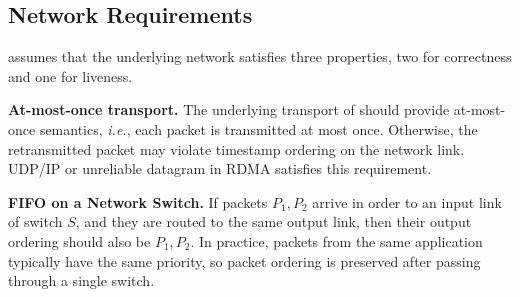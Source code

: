 




\iffalse
\subsection{Network Requirements}
\label{sec:assumptions}

\sys assumes that the underlying network satisfies three properties, two for correctness and one for liveness.

\textbf{At-most-once transport.}
The underlying transport of \sys should provide at-most-once semantics, \textit{i.e.}, each packet is transmitted at most once.
Otherwise, the retransmitted packet may violate timestamp ordering on the network link.
UDP/IP or unreliable datagram in RDMA satisfies this requirement.

\textbf{FIFO on a Network Switch.}
If packets $P_1, P_2$ arrive in order to an input link of switch $S$, and they are routed to the same output link, then their output ordering should also be $P_1, P_2$.
In practice, packets from the same application typically have the same priority, so packet ordering is preserved after passing through a single switch.

